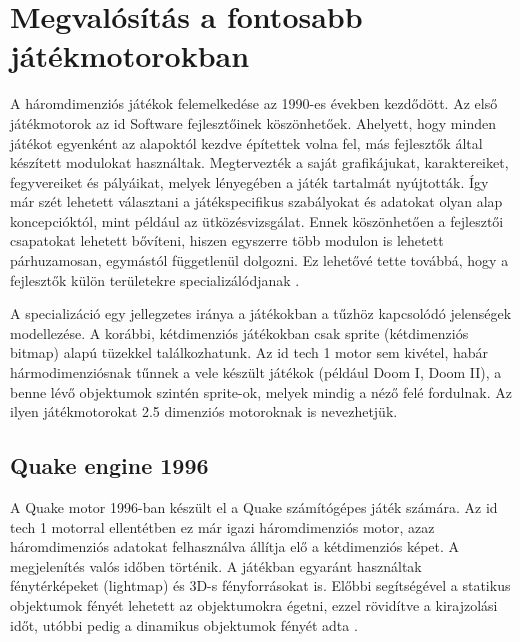 

\section{Megvalósítás a fontosabb játékmotorokban}

A háromdimenziós játékok felemelkedése az 1990-es években kezdődött. Az első játékmotorok az id Software fejlesztőinek köszönhetőek. Ahelyett, hogy minden játékot egyenként az alapoktól kezdve építettek volna fel, más fejlesztők által készített modulokat használtak. Megtervezték a saját grafikájukat, karaktereiket, fegyvereiket és pályáikat, melyek lényegében a játék tartalmát nyújtották. Így már szét lehetett választani a játékspecifikus szabályokat és adatokat olyan alap koncepcióktól, mint például az ütközésvizsgálat. Ennek köszönhetően a fejlesztői csapatokat lehetett bővíteni, hiszen egyszerre több modulon is lehetett párhuzamosan, egymástól függetlenül dolgozni. Ez lehetővé tette továbbá, hogy a fejlesztők külön területekre specializálódjanak \cite{wikiGameEngine}.

A specializáció egy jellegzetes iránya a játékokban a tűzhöz kapcsolódó jelenségek modellezése. A korábbi, kétdimenziós játékokban csak sprite (kétdimenziós bitmap) alapú tüzekkel találkozhatunk. Az id tech 1 motor sem kivétel, habár hármodimenziósnak tűnnek a vele készült játékok (például Doom I, Doom II), a benne lévő objektumok szintén sprite-ok, melyek mindig a néző felé fordulnak. Az ilyen játékmotorokat 2.5 dimenziós motoroknak is nevezhetjük. 


\subsection{Quake engine 1996}


A Quake motor 1996-ban készült el a Quake számítógépes játék számára. Az id tech 1 motorral ellentétben ez már igazi háromdimenziós motor, azaz háromdimenziós adatokat felhasználva állítja elő a kétdimenziós képet. A megjelenítés valós időben történik. A játékban egyaránt használtak fénytérképeket (lightmap) és 3D-s fényforrásokat is. Előbbi segítségével a statikus objektumok fényét lehetett az objektumokra égetni, ezzel rövidítve a kirajzolási időt, utóbbi pedig a dinamikus objektumok fényét adta \cite{wikiQuake}.

